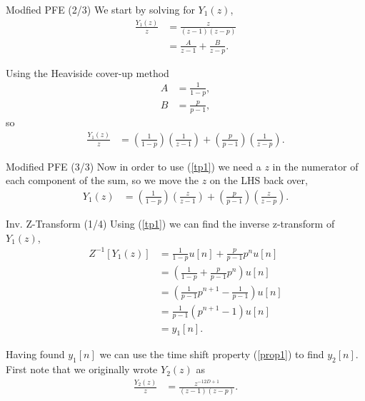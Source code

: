 \documentclass[
    orient=landscape,
    style=sailor
]{powerdot}
\begin{document}
\begin{slide}{Modfied PFE (2/3)}	
	We start by solving for $Y_1(z)$,
	\begin{align}
	\frac{Y_1(z)}{z} &= \frac{z}{(z-1)(z - p)} \\
	&= \frac{A}{z-1} + \frac{B}{z-p}.
	\end{align}
	
	Using the Heaviside cover-up method
	\begin{align}
	A &= \frac{1}{1 - p}, \\
	B &= \frac{p}{p - 1},
	\end{align}
	so
	\begin{align}
	\frac{Y_1(z)}{z} &= \left(\frac{1}{1 - p}\right)\left(\frac{1}{z-1}\right) 
	+ \left(\frac{p}{p - 1}\right)\left(\frac{1}{z-p}\right).
	\end{align}
\end{slide}

\begin{slide}{Modified PFE (3/3)}
	Now in order to use (\ref{tp1}) we need a $z$ in the numerator of each component of the sum, so we move the $z$ on the LHS back over,
	\begin{align}
	Y_1(z) &= \left(\frac{1}{1 - p}\right)\left(\frac{z}{z-1}\right) 
	+ \left(\frac{p}{p - 1}\right)\left(\frac{z}{z-p}\right).
	\end{align}
\end{slide}

\begin{slide}{Inv. Z-Transform (1/4)}
	Using (\ref{tp1}) we can find the inverse z-transform of $Y_1(z)$,
	\begin{align}
	Z^{-1}\left[Y_1(z)\right] &= \frac{1}{1 - p}u[n] + \frac{p}{p - 1}p^n u[n] \\
	&= \left(\frac{1}{1 - p} + \frac{p}{p - 1}p^n \right)u[n] \\
	&= \left(\frac{1}{p - 1}p^{n+1} - \frac{1}{p - 1} \right)u[n] \\
	&= \frac{1}{p - 1}\left(p^{n+1} - 1 \right)u[n] \\
	&= y_1[n].
	\end{align}
	
	Having found $y_1[n]$ we can use the time shift property (\ref{prop1}) to find $y_2[n]$. First note that we originally wrote $Y_2(z)$ as
	\begin{align}
	\frac{Y_2(z)}{z} &= \frac{z^{-12D+1}}{(z-1)(z - p)}.
	\end{align}
\end{slide}
\end{document}
